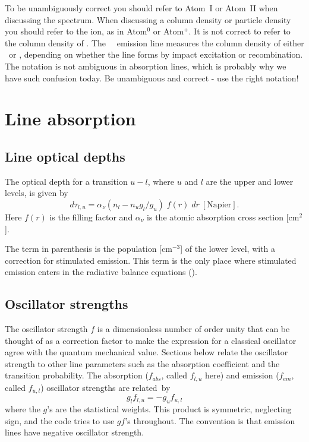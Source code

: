 To be unambiguously correct you should refer to Atom~I or Atom~II when
discussing the spectrum.
When discussing a column density or particle
density you should refer to the ion, as in Atom$^0$ or Atom$^+$.
It is not correct
to refer to the column density of \hi.
The \la\ \hi\  emission
line measures the column density of either \hO\ or \hplus,
depending on whether the line forms by impact excitation or recombination.
The notation is not ambiguous in absorption lines, which is probably why
we have such confusion today.
Be unambiguous and correct - use the right notation!

\section{Line absorption}

\subsection{Line optical depths}

The optical depth for a transition $u-l$,  where $u$ and $l$ are the upper
and lower levels, is given by
\begin{equation}
\label{eqn:OpticalDepthIncrement}
d{\tau _{l,u}} = {\alpha _\nu }\left( {{n_l} - {n_u}{g_l}/{g_u}}
\right)\;f(r)\;dr
\ [\mathrm{Napier}].
\end{equation}
Here $f (r)$ is the filling factor and $\alpha _\nu$ is the
atomic absorption cross section [cm$^2$].

The term in parenthesis is the population [cm$^{-3}$] of the lower level,
with a correction for stimulated emission.
This term is the only place where
stimulated emission enters in the radiative balance equations (\citealp{Elitzur1983}).

\subsection{Oscillator strengths}

The oscillator strength $f$ is a dimensionless number of order unity that
can be thought of as a correction factor to make the expression for a
classical oscillator agree with the quantum mechanical value.
Sections
below relate the oscillator strength to other line parameters such as the
absorption coefficient and the transition probability.
The absorption
($f_{abs}$,
called $f_{l,u}$ here) and emission ($f_{em}$, called $f_{u,l}$)
oscillator strengths are related~by
\begin{equation}
{g_l}{f_{l,u}} =  - {g_u}{f_{u,l}}%
\end{equation}
where the $g$'s are the statistical weights.
This product is symmetric,
neglecting sign, and the code tries to use $gf$'s throughout.
The convention
is that emission lines have negative oscillator strength.

